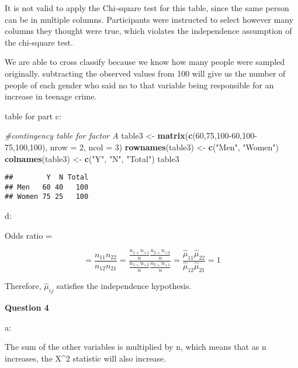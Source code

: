 \documentclass[
]{article}
\newenvironment{Shaded}{\begin{snugshade}}{\end{snugshade}}
\newcommand{\CommentTok}[1]{\textcolor[rgb]{0.56,0.35,0.01}{\textit{#1}}}
\newcommand{\DataTypeTok}[1]{\textcolor[rgb]{0.13,0.29,0.53}{#1}}
\newcommand{\DecValTok}[1]{\textcolor[rgb]{0.00,0.00,0.81}{#1}}
\newcommand{\KeywordTok}[1]{\textcolor[rgb]{0.13,0.29,0.53}{\textbf{#1}}}
\newcommand{\NormalTok}[1]{#1}
\newcommand{\StringTok}[1]{\textcolor[rgb]{0.31,0.60,0.02}{#1}}
\begin{document}
It is not valid to apply the Chi-square test for this table, since the
same person can be in multiple columns. Participants were instructed to
select however many columns they thought were true, which violates the
independence assumption of the chi-square test.

We are able to cross classify because we know how many people were
sampled originally. subtracting the observed values from 100 will give
us the number of people of each gender who said no to that variable
being responsible for an increase in teenage crime.

table for part c:

\begin{Shaded}
\begin{Highlighting}[]
\CommentTok{#contingency table for factor A}
\NormalTok{table3 <-}\StringTok{ }\KeywordTok{matrix}\NormalTok{(}\KeywordTok{c}\NormalTok{(}\DecValTok{60}\NormalTok{,}\DecValTok{75}\NormalTok{,}\DecValTok{100-60}\NormalTok{,}\DecValTok{100-75}\NormalTok{,}\DecValTok{100}\NormalTok{,}\DecValTok{100}\NormalTok{), }\DataTypeTok{nrow =} \DecValTok{2}\NormalTok{, }\DataTypeTok{ncol =} \DecValTok{3}\NormalTok{) }
\KeywordTok{rownames}\NormalTok{(table3) <-}\StringTok{ }\KeywordTok{c}\NormalTok{(}\StringTok{"Men"}\NormalTok{, }\StringTok{"Women"}\NormalTok{)}
\KeywordTok{colnames}\NormalTok{(table3) <-}\StringTok{ }\KeywordTok{c}\NormalTok{(}\StringTok{"Y"}\NormalTok{, }\StringTok{"N"}\NormalTok{, }\StringTok{"Total"}\NormalTok{)}
\NormalTok{table3}
\end{Highlighting}
\end{Shaded}

\begin{verbatim}
##        Y  N Total
## Men   60 40   100
## Women 75 25   100
\end{verbatim}

d:

Odds ratio =

\[=\frac{n_{11}n_{22}}{n_{12}n_{21}} = \frac{\frac{n_{1+}n_{+1}}{n}\frac{n_{2+}n_{+2}}{n}}{\frac{n_{1+}n_{+2}}{n}\frac{n_{2+}n_{+1}}{n}} = \frac{{\hat{\mu}}_{11}{\hat{\mu}}_{22}}{{\hat{\mu}}_{12}{\hat{\mu}}_{21}} = 1\]

Therefore, \({\hat{\mu}}_{ij}\) satisfies the independence hypothesis.

\textbf{Question 4}

a:

The sum of the other variables is multiplied by n, which means that as n
increases, the X\^{}2 statistic will also increase.
\end{document}
